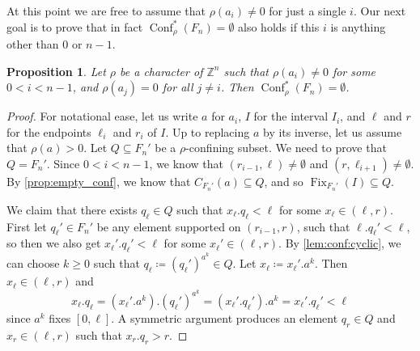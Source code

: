 \documentclass[reqno,12pt]{amsart}\setcounter{tocdepth}{1}
\newtheorem{proposition}[theorem]{Proposition}
\theoremstyle{definition}
\newcommand{\Z}{\mathbb{Z}}
\DeclareMathOperator{\Fix}{Fix}
\DeclareMathOperator{\Conf}{Conf}
\numberwithin{equation}{section}
\begin{document}
At this point we are free to assume that $\rho(a_i)\ne 0$ for just a single $i$. Our next goal is to prove that in fact $\Conf^\ast_\rho(F_n)=\emptyset$ also holds if this $i$ is anything other than $0$ or $n-1$.

\begin{proposition}\label{prop:middle_empty_conf}
Let $\rho$ be a character of $\Z^n$ such that $\rho(a_i)\ne 0$ for some $0<i<n-1$, and $\rho(a_j)=0$ for all $j\ne i$. Then $\Conf^\ast_\rho(F_n)=\emptyset$.
\end{proposition}

\begin{proof}
For notational ease, let us write $a$ for $a_i$, $I$ for the interval $I_i$, and $\ell$ and $r$ for the endpoints $\ell_i$ and $r_i$ of $I$. Up to replacing $a$ by its inverse, let us assume that $\rho(a) > 0$. Let $Q\subseteq F_n'$ be a $\rho$-confining subset. We need to prove that $Q=F_n'$. Since $0<i<n-1$, we know that $(r_{i-1},\ell)\ne\emptyset$ and $(r,\ell_{i+1})\ne\emptyset$. By \cref{prop:empty_conf}, we know that $C_{F_n'}(a) \subseteq Q$, and so $\Fix_{F_n'}(I)\subseteq Q$. 

We claim that there exists $q_\ell\in Q$ such that $x_\ell.q_\ell<\ell$ for some $x_\ell\in (\ell,r)$. First let $q_\ell'\in F_n'$ be any element supported on $(r_{i-1},r)$, such that $\ell.q_\ell'<\ell$, so then we also get $x_\ell'.q_\ell'<\ell$ for some $x_\ell'\in (\ell,r)$. By \cref{lem:conf:cyclic}, we can choose $k \geq 0$ such that $q_\ell\coloneqq (q_\ell')^{a^k}\in Q$. Let $x_\ell\coloneqq x_\ell'.a^k$. Then $x_\ell\in (\ell,r)$ and
\[
x_\ell.q_\ell = (x_\ell'.a^k).(q_\ell')^{a^k} = (x_\ell'.q_\ell').a^k = x_\ell'.q_\ell'<\ell
\]
since $a^k$ fixes $[0,\ell]$. A symmetric argument produces an element $q_r\in Q$ and $x_r\in(\ell,r)$ such that $x_r.q_r>r$.


\end{proof}
\end{document}
